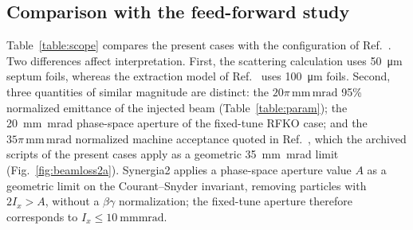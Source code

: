 \documentclass[a4paper,fleqn]{cas-sc}
\begin{document}
\subsection{\label{sec:comparison}Comparison with the feed-forward study}

Table~\ref{table:scope} compares the present cases with the configuration of Ref.~\cite{mu2e}. Two differences affect interpretation. First, the scattering calculation uses \SI{50}{\micro\metre} septum foils, whereas the extraction model of Ref.~\cite{mu2e} uses \SI{100}{\micro\metre} foils. Second, three quantities of similar magnitude are distinct: the $20\pi\,\mathrm{mm\,mrad}$ 95\% normalized emittance of the injected beam (Table~\ref{table:param}); the \SI{20}{\milli\metre\milli\radian} phase-space aperture of the fixed-tune RFKO case; and the $35\pi\,\mathrm{mm\,mrad}$ normalized machine acceptance quoted in Ref.~\cite{mu2e}, which the archived scripts of the present cases apply as a geometric \SI{35}{\milli\metre\milli\radian} limit (Fig.~\ref{fig:beamloss2a}). Synergia2 applies a phase-space aperture value $A$ as a geometric limit on the Courant--Snyder invariant, removing particles with $2I_x>A$, without a $\beta\gamma$ normalization; the fixed-tune aperture therefore corresponds to $I_x\le\SI{10}{\milli\metre\milli\radian}$.
\end{document}
